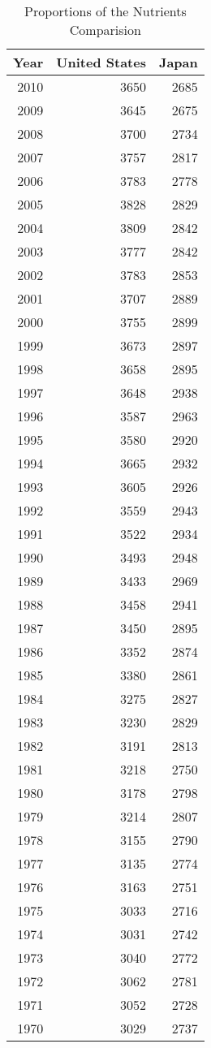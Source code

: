 \documentclass[11pt,a4paper,]{article}
\begin{document}
\begin{table}

\caption{\label{tab:ThreemajorComparision}Proportions of the Nutrients Comparision}
\centering
\begin{tabular}[t]{r|r|r}
\hline
Year & United States & Japan\\
\hline
2010 & 3650 & 2685\\
\hline
2009 & 3645 & 2675\\
\hline
2008 & 3700 & 2734\\
\hline
2007 & 3757 & 2817\\
\hline
2006 & 3783 & 2778\\
\hline
2005 & 3828 & 2829\\
\hline
2004 & 3809 & 2842\\
\hline
2003 & 3777 & 2842\\
\hline
2002 & 3783 & 2853\\
\hline
2001 & 3707 & 2889\\
\hline
2000 & 3755 & 2899\\
\hline
1999 & 3673 & 2897\\
\hline
1998 & 3658 & 2895\\
\hline
1997 & 3648 & 2938\\
\hline
1996 & 3587 & 2963\\
\hline
1995 & 3580 & 2920\\
\hline
1994 & 3665 & 2932\\
\hline
1993 & 3605 & 2926\\
\hline
1992 & 3559 & 2943\\
\hline
1991 & 3522 & 2934\\
\hline
1990 & 3493 & 2948\\
\hline
1989 & 3433 & 2969\\
\hline
1988 & 3458 & 2941\\
\hline
1987 & 3450 & 2895\\
\hline
1986 & 3352 & 2874\\
\hline
1985 & 3380 & 2861\\
\hline
1984 & 3275 & 2827\\
\hline
1983 & 3230 & 2829\\
\hline
1982 & 3191 & 2813\\
\hline
1981 & 3218 & 2750\\
\hline
1980 & 3178 & 2798\\
\hline
1979 & 3214 & 2807\\
\hline
1978 & 3155 & 2790\\
\hline
1977 & 3135 & 2774\\
\hline
1976 & 3163 & 2751\\
\hline
1975 & 3033 & 2716\\
\hline
1974 & 3031 & 2742\\
\hline
1973 & 3040 & 2772\\
\hline
1972 & 3062 & 2781\\
\hline
1971 & 3052 & 2728\\
\hline
1970 & 3029 & 2737\\
\hline
\end{tabular}
\end{table}
\end{document}
